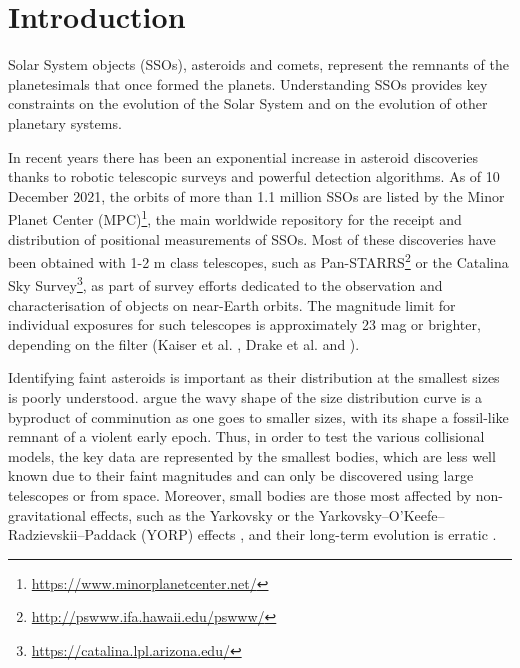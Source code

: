 \documentclass{aa}
\begin{document}
   \maketitle
%

\section{Introduction}

Solar System objects (SSOs), asteroids and comets, represent the remnants of the planetesimals that once formed the planets. Understanding SSOs provides key constraints on the evolution of the Solar System and on the evolution of other planetary systems.

In recent years there has been an exponential increase in asteroid discoveries thanks to robotic telescopic surveys and powerful detection algorithms. As of 10 December 2021, the orbits of more than 1.1 million SSOs are listed by the Minor Planet Center (MPC)\footnote{\url{https://www.minorplanetcenter.net/}}, the main worldwide repository for the receipt and distribution of positional measurements of SSOs. Most of these discoveries have been obtained with 1-2 m class telescopes, such as Pan-STARRS\footnote{\url{http://pswww.ifa.hawaii.edu/pswww/}} or the Catalina Sky Survey\footnote{\url{https://catalina.lpl.arizona.edu/}}, as part of survey efforts dedicated to the observation and characterisation of objects on near-Earth orbits. The magnitude limit for individual exposures for such telescopes is approximately 23 mag or brighter, depending on the filter 
(Kaiser et al. \citeyear{Kaiser2010}, Drake et al. \citeyear{Drake2014a} and \citeyear{Drake2017}). 

Identifying faint asteroids is important as their distribution at the smallest sizes is poorly understood. \citet{2015aste.book..701B} argue the wavy shape of the size distribution curve is a byproduct of comminution as one goes to smaller sizes, with its shape a fossil-like remnant of a violent early epoch.  Thus, in order to test the various collisional models, the key data are represented by the smallest bodies, which are less well known due to their faint magnitudes and can only be discovered using large telescopes or from space.  Moreover, small bodies are those most affected by non-gravitational effects, such as the Yarkovsky or the Yarkovsky–O'Keefe–Radzievskii–Paddack (YORP) effects \citep{Bottke2006, Vokrouhlicky2015}, and their long-term evolution is erratic \citep{2015Icar..247..191B}.
\end{document}
